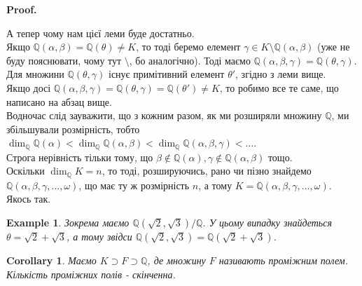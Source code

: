 \documentclass[a4paper, 14pt]{extarticle}
\makeatletter
\theoremstyle{theoremdd}
\theoremstyle{theoremdd}
\theoremstyle{theoremdd}
\theoremstyle{theoremdd}
\newtheorem{example}[theorem]{Example}
\theoremstyle{theoremdd}
\theoremstyle{theoremdd}
\theoremstyle{theoremdd}
\theoremstyle{theoremdd}
\newtheorem{corollary}[theorem]{Corollary}
\def\qed{$\blacksquare$}
\renewenvironment{proof}[1][Proof.\\]{\par
\pushQED{\hfill \qed}%
\normalfont \topsep6\p@\@plus6\p@\relax
\trivlist
\item\relax
{\bfseries
#1\@addpunct{.}}\hspace\labelsep\ignorespaces
}{%
\popQED\endtrivlist\@endpefalse
}
\makeatother
\begin{document}
\begin{proof}
А тепер чому нам цієї леми буде достатньо.\\
Якщо $\mathbb{Q}(\alpha,\beta) = \mathbb{Q}(\theta) \neq K$, то тоді беремо елемент $\gamma \in K \setminus \mathbb{Q}(\alpha,\beta)$ (уже не буду пояснювати, чому тут $\setminus$, бо аналогічно). Тоді маємо $\mathbb{Q}(\alpha,\beta,\gamma) = \mathbb{Q}(\theta,\gamma)$. Для множини $\mathbb{Q}(\theta,\gamma)$ існує примітивний елемент $\theta'$, згідно з леми вище.\\
Якщо досі $\mathbb{Q}(\alpha,\beta,\gamma) = \mathbb{Q}(\theta, \gamma) = \mathbb{Q}(\theta') \neq K$, то робимо все те саме, що написано на абзац вище.
\bigskip \\
Водночас слід зауважити, що з кожним разом, як ми розширяли множину $\mathbb{Q}$, ми збільшували розмірність, тобто\\
$\dim_\mathbb{Q} \mathbb{Q}(\alpha) < \dim_\mathbb{Q} \mathbb{Q}(\alpha,\beta) < \dim_\mathbb{Q} \mathbb{Q}(\alpha,\beta,\gamma) < \dots$.\\
Строга нерівність тільки тому, що $\beta \not \in \mathbb{Q}(\alpha), \gamma \not \in \mathbb{Q}(\alpha,\beta)$ тощо.\\
Оскільки $\dim_\mathbb{Q} K = n$, то тоді, розшируючись, рано чи пізно знайдемо $\mathbb{Q}(\alpha,\beta,\gamma,\dots,\omega)$, що має ту ж розмірність $n$, а тому $K = \mathbb{Q}(\alpha,\beta,\gamma,\dots,\omega)$.\\
Якось так.
\end{proof}

\begin{example}
Зокрема маємо $\mathbb{Q}(\sqrt{2},\sqrt{3}) / \mathbb{Q}$. У цьому випадку знайдеться $\theta = \sqrt{2} + \sqrt{3}$, а тому звідси $\mathbb{Q}(\sqrt{2},\sqrt{3}) = \mathbb{Q}(\sqrt{2} + \sqrt{3})$.
\end{example}

\begin{corollary}
Маємо $K \supset F \supset \mathbb{Q}$, де множину $F$ називають проміжним полем. Кількість проміжних полів - скінченна.
\end{corollary}
\end{document}
